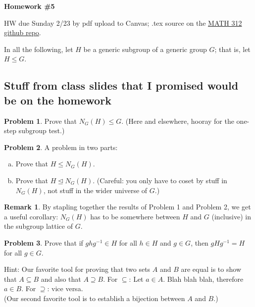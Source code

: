 \documentclass[12pt]{article}
\theoremstyle{definition} %
\newtheorem{problem}{Problem}
\newtheorem*{remark}{Remark}
\newcommand\inv{^{-1}} %
\def\normaleq{\unlhd}
\renewcommand{\section}[1]{\begin{center} \textbf{#1} \\\end{center}}
\begin{document}
\section{Homework \#5} %

HW due Sunday 2/23 by pdf upload to Canvas; .tex source on the \href{https://github.com/rhinopotamus/math312}{MATH 312 github repo}.

In all the following, let $H$ be a generic subgroup of a generic group $G$; that is, let $H \leq G$.

\subsection*{Stuff from class slides that I promised would be on the homework}

\begin{problem}
    Prove that $N_G(H) \leq G$. (Here and elsewhere, hooray for the one-step subgroup test.)
\end{problem}

\begin{problem} A problem in two parts:
    \begin{enumerate}[(a)]
        \item Prove that $H \leq N_G(H)$.
        \item Prove that $H\normaleq N_G(H)$. (Careful: you only have to coset by stuff in $N_G(H)$, not stuff in the wider universe of $G$.)
    \end{enumerate} 
\end{problem}

\begin{remark}
    By stapling together the results of Problem 1 and Problem 2, we get a useful corollary: $N_G(H)$ has to be somewhere between $H$ and $G$ (inclusive) in the subgroup lattice of $G$.
\end{remark} 

\begin{problem}
    Prove that if $ghg\inv \in H$ for all $h\in H$ and $g\in G$, then $gHg\inv = H$ for all $g\in G$.

    Hint: Our favorite tool for proving that two sets $A$ and $B$ are equal is to show that $A \subseteq B$ and also that $A \supseteq B$. For $\subseteq$: Let $a\in A$. Blah blah blah, therefore $a\in B$. For $\supseteq$: vice versa. \\ (Our second favorite tool is to establish a bijection between $A$ and $B$.)
\end{problem}
\end{document}
